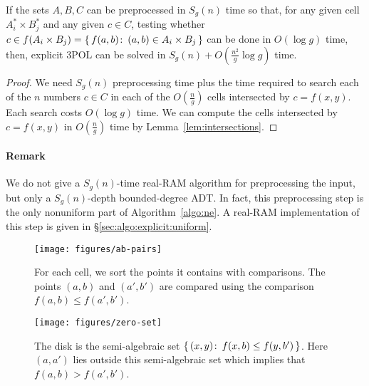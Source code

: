 \begin{lemma}\label{lem:preprocessing}
    If the sets $A,B,C$ can be preprocessed in $S_g(n)$ time so that,
    for any given cell $A_i^* \times B_j^*$ and any given $c \in C$, testing whether
    $c \in f(A_i \times B_j) = \{\,f(a,b)\colon\, (a,b) \in A_i \times B_j\,\}$ can be done in
    $O(\log g)$ time, then, explicit 3POL can be solved in
    $S_g(n)+O(\frac{n^2}{g}\log g)$ time.
\end{lemma}
\begin{proof}
    We need $S_g(n)$ preprocessing time plus the time required
    to search each of the $n$ numbers $c \in C$ in each of the $O(\frac ng)$
    cells intersected by $c=f(x,y)$. Each search costs $O(\log g)$ time.
    We can compute the cells intersected by $c=f(x,y)$ in $O(\frac ng)$ time
    by Lemma~\ref{lem:intersections}.
\end{proof}
\paragraph{Remark} We do not give a $S_g(n)$-time real-RAM
algorithm for preprocessing the input, but only a $S_g(n)$-depth bounded-degree
ADT\@. In fact, this preprocessing step is the only
nonuniform part of Algorithm~\ref{algo:ne}. A real-RAM implementation of this
step is given in
\S\ref{sec:algo:explicit:uniform}.

\begin{figure*}
\centering
\texttt{[image: figures/ab-pairs]}
\caption{For each cell, we sort the points it contains with comparisons.
The points \((a,b)\) and \((a',b')\) are compared using the comparison
\( f(a,b) \le f(a',b') \).}%
\label{fig:ab-pairs}
\end{figure*}
\begin{figure*}
\centering
\texttt{[image: figures/zero-set]}
\caption{%
The disk is the semi-algebraic set \( \{\, (x,y) \colon\, f(x,b) \le f(y,b')\,\} \).
Here $(a,a')$ lies outside this semi-algebraic set which implies that $f(a,b) >
f(a',b')$.}%
\label{fig:zero-set}
\end{figure*}
